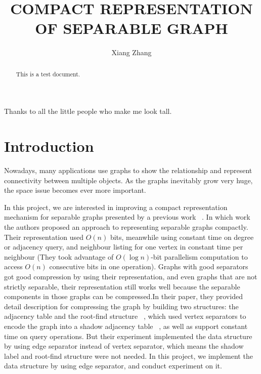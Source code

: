 \documentclass[12pt,glossary]{dalthesis}
\begin{document}
\macs  %
\title{COMPACT REPRESENTATION OF SEPARABLE GRAPH}
\author{Xiang Zhang}



\nolistoftables
\nolistoffigures

\frontmatter

\begin{abstract}
This is a test document.
\end{abstract}

\printglossary

\begin{acknowledgements}
Thanks to all the little people who make me look tall.
\end{acknowledgements}

\mainmatter

\chapter{Introduction}

Nowadays, many applications use graphs to show the relationship and represent connectivity between multiple objects. As the graphs inevitably grow very huge, the space issue becomes ever more important.

In this project, we are interested in improving a compact representation mechanism for separable graphs presented by a previous work ~\cite{compact-representation}. In which work the authors proposed an approach to representing separable graphs compactly. Their representation used $O(n)$ bits, meanwhile using constant time on degree or adjacency query, and neighbour listing for one vertex in constant time per neighbour (They took advantage of $O(\log n)$-bit parallelism computation to access $O(n)$ consecutive bits in one operation). Graphs with good separators got good compression by using their representation, and even graphs that are not strictly separable, their representation still works well because the separable components in those graphs can be compressed.In their paper, they provided detail description for compressing the graph by building two structures: the adjacency table and the root-find structure ~\cite{compact-representation}, which used vertex separators to encode the graph into a shadow adjacency table ~\cite{compact-representation}, as well as support constant time on query operations. But their experiment implemented the data structure by using edge separator instead of vertex separator, which means the shadow label
and root-find structure were not needed. In this project, we implement the data structure by using edge separator, and conduct experiment on it.
\end{document}
